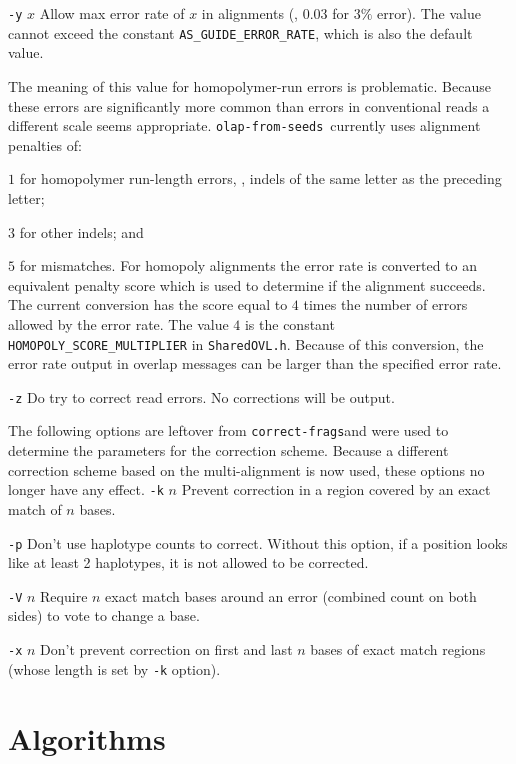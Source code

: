 \documentclass[letterpaper,11pt]{article}
\def\Pgm#1{\texttt{#1}}
\def\correctfrags{\Pgm{correct-frags}}
\def\ofs{\Pgm{olap-from-seeds}}
\newenvironment{technotes}{\bq\small\bf\bi\exdent{Technical Notes:}}{\ei\eq}
\def\btn{\begin{technotes}}
\def\etn{\end{technotes}}
\begin{document}
\exdent
  \Pgm{-y} $x$ \quad
  Allow max error rate of $x$ in alignments (\eg, $0.03$ for $3\%$ error).
  The value cannot exceed the constant \verb`AS_GUIDE_ERROR_RATE`, which
  is also the default value.
  \btn
  \item
    The meaning of this value for homopolymer-run errors is problematic.
    Because these errors are significantly more common than errors in
    conventional reads a different scale seems appropriate.  \ofs\ currently
    uses alignment penalties of:
    \bi
    \item
      $1$ for homopolymer run-length errors, \ie, indels of the same letter
      as the preceding letter;
    \item
      $3$ for other indels; and
    \item
      $5$ for mismatches.
    \ei
    For homopoly alignments the error rate is converted to an equivalent
    penalty score which is used to determine if the alignment succeeds.
    The current conversion has the score equal to $4$ times the number
    of errors allowed by the error rate.  The value $4$ is the
    constant \verb`HOMOPOLY_SCORE_MULTIPLIER` in \Pgm{SharedOVL.h}.
    Because of this conversion, the error rate output in overlap messages
    can be larger than the specified error rate.
  \etn

\exdent
  \Pgm{-z} \quad
  Do  try to correct read errors.  No corrections will be output.
\ei

The following options are leftover from \correctfrags and were
used to determine the parameters for the correction scheme.  Because a
different correction scheme based on the multi-alignment is now used,
these options no longer have any effect.
\bi
\exdent
  \Pgm{-k} $n$ \quad
  Prevent correction in a region covered by an exact match of $n$ bases.

\exdent
  \Pgm{-p} \quad
  Don't use haplotype counts to correct.  Without this option, if
  a position looks like at least 2 haplotypes, it is not allowed
  to be corrected.

\exdent
  \Pgm{-V} $n$ \quad
  Require $n$ exact match bases around an error (combined count
  on both sides) to vote to change a base.

\exdent
  \Pgm{-x} $n$ \quad
  Don't prevent correction on first and last $n$ bases of exact match
  regions (whose length is set by \Pgm{-k} option).
\ei

\section{Algorithms}
\end{document}

